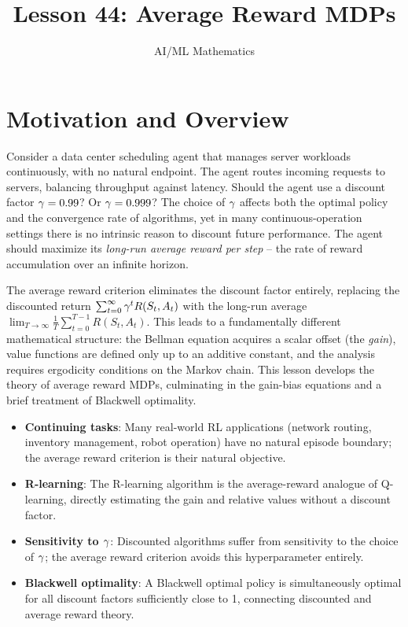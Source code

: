 \documentclass[11pt,a4paper]{article}
\title{Lesson 44: Average Reward MDPs}
\author{AI/ML Mathematics}
\date{}
\begin{document}
\maketitle
\tableofcontents
\newpage


\section{Motivation and Overview}
\label{sec:motivation}

Consider a data center scheduling agent that manages server workloads
continuously, with no natural endpoint. The agent routes incoming
requests to servers, balancing throughput against latency. Should the
agent use a discount factor $\gamma = 0.99$? Or $\gamma = 0.999$?
The choice of $\gamma$ affects both the optimal policy and the
convergence rate of algorithms, yet in many continuous-operation
settings there is no intrinsic reason to discount future performance.
The agent should maximize its \emph{long-run average reward per step}
-- the rate of reward accumulation over an infinite horizon.

The average reward criterion eliminates the discount factor entirely,
replacing the discounted return
$\sum_{t=0}^\infty \gamma^t R(S_t, A_t)$ with the long-run
average $\lim_{T \to \infty} \frac{1}{T} \sum_{t=0}^{T-1}
R(S_t, A_t)$. This leads to a fundamentally different mathematical
structure: the Bellman equation acquires a scalar offset (the
\emph{gain}), value functions are defined only up to an additive
constant, and the analysis requires ergodicity conditions on the
Markov chain. This lesson develops the theory of average reward MDPs,
culminating in the gain-bias equations and a brief treatment of
Blackwell optimality.

\begin{rlconnection}[title={Why Average Reward MDPs Matter for RL/ML}]
\begin{itemize}[nosep]
    \item \textbf{Continuing tasks}: Many real-world RL applications
    (network routing, inventory management, robot operation) have no
    natural episode boundary; the average reward criterion is their
    natural objective.
    \item \textbf{R-learning}: The R-learning algorithm is the
    average-reward analogue of Q-learning, directly estimating the
    gain and relative values without a discount factor.
    \item \textbf{Sensitivity to $\gamma$}: Discounted algorithms
    suffer from sensitivity to the choice of $\gamma$; the
    average reward criterion avoids this hyperparameter entirely.
    \item \textbf{Blackwell optimality}: A Blackwell optimal policy
    is simultaneously optimal for all discount factors sufficiently
    close to 1, connecting discounted and average reward theory.
\end{itemize}
\end{rlconnection}
\end{document}
